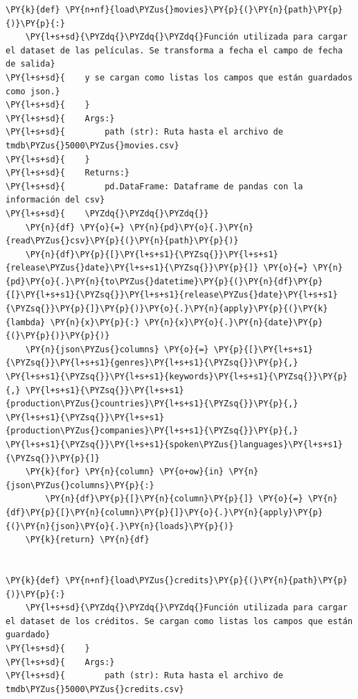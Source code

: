     \begin{tcolorbox}[breakable, size=fbox, boxrule=1pt, pad at break*=1mm,colback=cellbackground, colframe=cellborder]
\begin{Verbatim}[commandchars=\\\{\}]
\PY{k}{def} \PY{n+nf}{load\PYZus{}movies}\PY{p}{(}\PY{n}{path}\PY{p}{)}\PY{p}{:}
    \PY{l+s+sd}{\PYZdq{}\PYZdq{}\PYZdq{}Función utilizada para cargar el dataset de las películas. Se transforma a fecha el campo de fecha de salida}
\PY{l+s+sd}{    y se cargan como listas los campos que están guardados como json.}
\PY{l+s+sd}{    }
\PY{l+s+sd}{    Args:}
\PY{l+s+sd}{        path (str): Ruta hasta el archivo de tmdb\PYZus{}5000\PYZus{}movies.csv}
\PY{l+s+sd}{    }
\PY{l+s+sd}{    Returns:}
\PY{l+s+sd}{        pd.DataFrame: Dataframe de pandas con la información del csv}
\PY{l+s+sd}{    \PYZdq{}\PYZdq{}\PYZdq{}}
    \PY{n}{df} \PY{o}{=} \PY{n}{pd}\PY{o}{.}\PY{n}{read\PYZus{}csv}\PY{p}{(}\PY{n}{path}\PY{p}{)}
    \PY{n}{df}\PY{p}{[}\PY{l+s+s1}{\PYZsq{}}\PY{l+s+s1}{release\PYZus{}date}\PY{l+s+s1}{\PYZsq{}}\PY{p}{]} \PY{o}{=} \PY{n}{pd}\PY{o}{.}\PY{n}{to\PYZus{}datetime}\PY{p}{(}\PY{n}{df}\PY{p}{[}\PY{l+s+s1}{\PYZsq{}}\PY{l+s+s1}{release\PYZus{}date}\PY{l+s+s1}{\PYZsq{}}\PY{p}{]}\PY{p}{)}\PY{o}{.}\PY{n}{apply}\PY{p}{(}\PY{k}{lambda} \PY{n}{x}\PY{p}{:} \PY{n}{x}\PY{o}{.}\PY{n}{date}\PY{p}{(}\PY{p}{)}\PY{p}{)}
    \PY{n}{json\PYZus{}columns} \PY{o}{=} \PY{p}{[}\PY{l+s+s1}{\PYZsq{}}\PY{l+s+s1}{genres}\PY{l+s+s1}{\PYZsq{}}\PY{p}{,} \PY{l+s+s1}{\PYZsq{}}\PY{l+s+s1}{keywords}\PY{l+s+s1}{\PYZsq{}}\PY{p}{,} \PY{l+s+s1}{\PYZsq{}}\PY{l+s+s1}{production\PYZus{}countries}\PY{l+s+s1}{\PYZsq{}}\PY{p}{,} \PY{l+s+s1}{\PYZsq{}}\PY{l+s+s1}{production\PYZus{}companies}\PY{l+s+s1}{\PYZsq{}}\PY{p}{,} \PY{l+s+s1}{\PYZsq{}}\PY{l+s+s1}{spoken\PYZus{}languages}\PY{l+s+s1}{\PYZsq{}}\PY{p}{]}
    \PY{k}{for} \PY{n}{column} \PY{o+ow}{in} \PY{n}{json\PYZus{}columns}\PY{p}{:}
        \PY{n}{df}\PY{p}{[}\PY{n}{column}\PY{p}{]} \PY{o}{=} \PY{n}{df}\PY{p}{[}\PY{n}{column}\PY{p}{]}\PY{o}{.}\PY{n}{apply}\PY{p}{(}\PY{n}{json}\PY{o}{.}\PY{n}{loads}\PY{p}{)}
    \PY{k}{return} \PY{n}{df}


\PY{k}{def} \PY{n+nf}{load\PYZus{}credits}\PY{p}{(}\PY{n}{path}\PY{p}{)}\PY{p}{:}
    \PY{l+s+sd}{\PYZdq{}\PYZdq{}\PYZdq{}Función utilizada para cargar el dataset de los créditos. Se cargan como listas los campos que están guardado}
\PY{l+s+sd}{    }
\PY{l+s+sd}{    Args:}
\PY{l+s+sd}{        path (str): Ruta hasta el archivo de tmdb\PYZus{}5000\PYZus{}credits.csv}


\end{Verbatim}
\end{tcolorbox}
